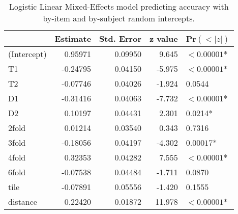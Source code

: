 \begin{table}
\centering
\begin{tabular}{|l|rrrl|}
\hline
& Estimate & Std. Error & z value & Pr$(<|z|)$  \\ \hline
(Intercept) & 0.95971 &  0.09950 & 9.645 & $<0.00001$* \\ \hline
T1 & -0.24795 &  0.04150 & -5.975 &  $<0.00001$* \\ \hline
T2 & -0.07746 & 0.04026 & -1.924 & 0.0544 \\ \hline
D1 & -0.31416 & 0.04063 & -7.732 &  $<0.00001$* \\ \hline
D2 & 0.10197 & 0.04431 & 2.301 & 0.0214* \\ \hline
2fold & 0.01214 & 0.03540 & 0.343 & 0.7316 \\ \hline
3fold & -0.18056 & 0.04197 & -4.302 & $0.00017$* \\ \hline
4fold & 0.32353 & 0.04282 & 7.555 & $<0.00001$* \\ \hline
6fold & -0.07538 & 0.04484 & -1.711 & 0.0870 \\ \hline
tile & -0.07891 & 0.05556 & -1.420 & 0.1555 \\ \hline
distance & 0.22420 & 0.01872 & 11.978 & $<0.00001$*\\ \hline
\end{tabular}
\caption{Logistic Linear Mixed-Effects model predicting accuracy with by-item and by-subject random intercepts. }
\label{fixeff}
\end{table}